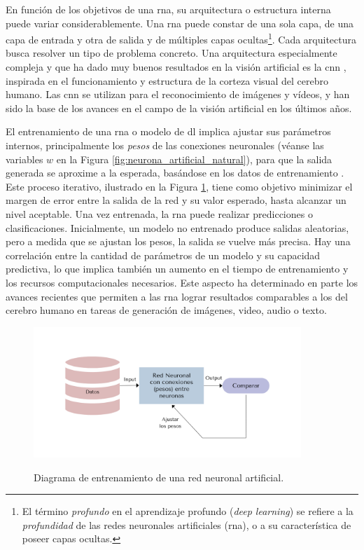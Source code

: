 En función de los objetivos de una \gls{rna}, su arquitectura o estructura interna puede variar considerablemente. Una \gls{rna} puede constar de una sola capa, de una capa de entrada y otra de salida y de múltiples capas ocultas\footnote{El término \emph{profundo} en el aprendizaje profundo (\emph{deep learning}) se refiere a la \emph{profundidad} de las redes neuronales artificiales (\gls{rna}), o a su característica de poseer capas ocultas.}. Cada arquitectura busca resolver un tipo de problema concreto. Una arquitectura especialmente compleja y que ha dado muy buenos resultados en la visión artificial es la \gls{cnn} \citep{osheaIntroductionConvolutionalNeural2015}, inspirada en el funcionamiento y estructura de la corteza visual del cerebro humano. Las \gls{cnn} se utilizan para el reconocimiento de imágenes y vídeos, y han sido la base de los avances en el campo de la visión artificial en los últimos años.

El entrenamiento de una \gls{rna} o modelo de \gls{dl} implica ajustar sus parámetros internos, principalmente los \emph{pesos} de las conexiones neuronales (véanse las variables $w$ en la Figura \ref{fig:neurona_artificial_natural}), para que la salida generada se aproxime a la esperada, basándose en los datos de entrenamiento \citep{NurArtificialNeural2014}. Este proceso iterativo, ilustrado en la Figura \ref{fig:ann_training}, tiene como objetivo minimizar el margen de error entre la salida de la red y su valor esperado, hasta alcanzar un nivel aceptable. Una vez entrenada, la \gls{rna} puede realizar predicciones o clasificaciones. Inicialmente, un modelo no entrenado produce salidas aleatorias, pero a medida que se ajustan los pesos, la salida se vuelve más precisa. Hay una correlación entre la cantidad de parámetros de un modelo y su capacidad predictiva, lo que implica también un aumento en el tiempo de entrenamiento y los recursos computacionales necesarios. Este aspecto ha determinado en parte los avances recientes que permiten a las \gls{rna} lograr resultados comparables a los del cerebro humano en tareas de generación de imágenes, video, audio o texto.

\begin{figure}[H]
    \caption[Diagrama de entrenamiento de una red neuronal artificial]{Diagrama de entrenamiento de una red neuronal artificial.}
    \centering
    \includegraphics[width=0.9\textwidth]{./figuras/ann_training.png}
    \source{\propio}
    \label{fig:ann_training}
\end{figure}

